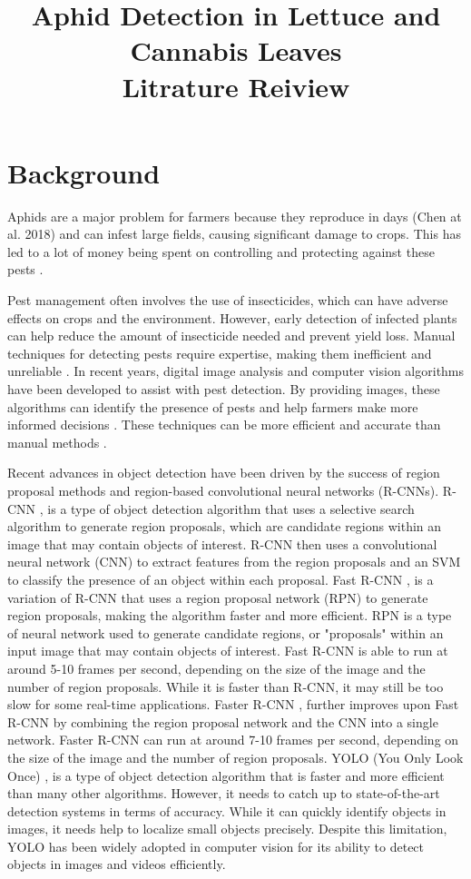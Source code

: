 \documentclass{article}
\title{Aphid Detection in Lettuce and Cannabis Leaves \\ Litrature Reiview}
\begin{document}
\maketitle

\section*{Background}
Aphids are a major problem for farmers because they reproduce in days (Chen at al. 2018)
and can infest large fields, causing significant damage to crops. 
This has led to a lot of money being spent on controlling and protecting against 
these pests \cite{CoarseToFine}.


Pest management often involves the use of insecticides, 
which can have adverse effects on crops and the environment. 
However, early detection of infected plants can help reduce the amount of insecticide needed and prevent yield loss. 
Manual techniques for detecting pests require expertise, making them inefficient and 
unreliable \cite{DetectionInWeatFields}. In recent years, digital image analysis and computer vision algorithms 
have been developed to assist with pest detection. By providing images, 
these algorithms can identify the presence of pests and help farmers make more informed decisions 
\cite{DetectionInWeatFields}. These techniques can be more efficient and accurate than manual methods \cite{DetectionInWeatFields}.


Recent advances in object detection have been driven by the success of region proposal methods and 
region-based convolutional neural networks (R-CNNs). 
R-CNN \cite{FasterRCNN}, is a type of object detection algorithm that uses a selective 
search algorithm to generate region proposals, which are candidate regions within an image that 
may contain objects of interest. R-CNN then uses a convolutional neural network (CNN) 
to extract features from the region proposals and an SVM to classify the presence of an 
object within each proposal. Fast R-CNN \cite{FasterRCNN}, 
is a variation of R-CNN that uses a region proposal network (RPN) to generate region proposals, 
making the algorithm faster and more efficient. RPN is a type of neural network used to generate candidate regions, 
or "proposals" within an input image that may contain objects of interest. 
Fast R-CNN is able to run at around 5-10 frames per second, depending on the size of the image 
and the number of region proposals. While it is faster than R-CNN, it may still be too slow for some 
real-time applications. Faster R-CNN \cite{FasterRCNN}, 
further improves upon Fast R-CNN by combining the region proposal network and the CNN into a single network. 
Faster R-CNN can run at around 7-10 frames per second, depending on the size of the image and 
the number of region proposals. YOLO (You Only Look Once) \cite{YOLO}, 
is a type of object detection algorithm that is faster and more efficient than many other algorithms. 
However, it needs to catch up to state-of-the-art detection systems in terms of accuracy. 
While it can quickly identify objects in images, it needs help to localize small objects precisely. 
Despite this limitation, YOLO has been widely adopted in computer vision for its ability to detect 
objects in images and videos efficiently.
\end{document}
